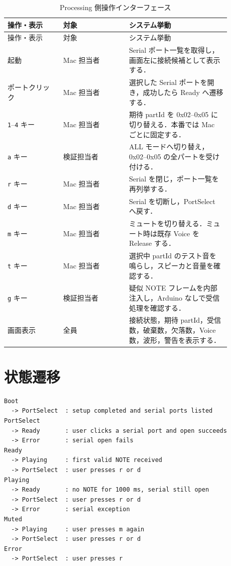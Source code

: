\documentclass[lualatex,book,openany,paper=a4paper,jafontsize=11.5pt,jafontscale=1.05]{jlreq}
\begin{document}
\begin{longtable}{p{0.22\linewidth}p{0.26\linewidth}p{0.40\linewidth}}
\caption{Processing 側操作インターフェース}\label{tab:ui}\\
\toprule
操作・表示 & 対象 & システム挙動 \\
\midrule
\endfirsthead
\toprule
操作・表示 & 対象 & システム挙動 \\
\midrule
\endhead
起動 & Mac 担当者 & Serial ポート一覧を取得し，画面左に接続候補として表示する． \\
ポートクリック & Mac 担当者 & 選択した Serial ポートを開き，成功したら Ready へ遷移する． \\
\texttt{1}--\texttt{4} キー & Mac 担当者 & 期待 partId を 0x02--0x05 に切り替える．本番では Mac ごとに固定する． \\
\texttt{a} キー & 検証担当者 & ALL モードへ切り替え，0x02--0x05 の全パートを受け付ける． \\
\texttt{r} キー & Mac 担当者 & Serial を閉じ，ポート一覧を再列挙する． \\
\texttt{d} キー & Mac 担当者 & Serial を切断し，PortSelect へ戻す． \\
\texttt{m} キー & Mac 担当者 & ミュートを切り替える．ミュート時は既存 Voice を Release する． \\
\texttt{t} キー & Mac 担当者 & 選択中 partId のテスト音を鳴らし，スピーカと音量を確認する． \\
\texttt{g} キー & 検証担当者 & 疑似 NOTE フレームを内部注入し，Arduino なしで受信処理を確認する． \\
画面表示 & 全員 & 接続状態，期待 partId，受信数，破棄数，欠落数，Voice 数，波形，警告を表示する． \\
\bottomrule
\end{longtable}

\section{状態遷移}
\begin{lstlisting}[style=textdiagram, caption={Processing 音源サブシステムの状態遷移}, label={lst:state}]
Boot
  -> PortSelect  : setup completed and serial ports listed
PortSelect
  -> Ready       : user clicks a serial port and open succeeds
  -> Error       : serial open fails
Ready
  -> Playing     : first valid NOTE received
  -> PortSelect  : user presses r or d
Playing
  -> Ready       : no NOTE for 1000 ms, serial still open
  -> PortSelect  : user presses r or d
  -> Error       : serial exception
Muted
  -> Playing     : user presses m again
  -> PortSelect  : user presses r or d
Error
  -> PortSelect  : user presses r
\end{lstlisting}
\end{document}
